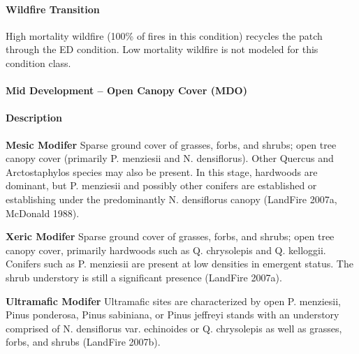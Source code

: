 \paragraph{Wildfire Transition} High mortality wildfire (100\% of fires in this condition) recycles the patch through the ED condition. Low mortality wildfire is not modeled for this condition class.

\noindent\hrulefill


\paragraph{Mid Development – Open Canopy Cover (MDO)}

\paragraph{Description}
\begin{adjustwidth}{2cm}{}
\textbf{Mesic Modifer } Sparse ground cover of grasses, forbs, and shrubs; open tree canopy cover (primarily P. menziesii and N. densiflorus). Other Quercus and Arctostaphylos species may also be present. In this stage, hardwoods are dominant, but P. menziesii and possibly other conifers are established or establishing under the predominantly N. densiflorus canopy (LandFire 2007a, McDonald 1988). 


\medskip
\noindent \textbf{Xeric Modifer}  Sparse ground cover of grasses, forbs, and shrubs; open tree canopy cover, primarily hardwoods such as Q. chrysolepis and Q. kelloggii. Conifers such as P. menziesii are present at low densities in emergent status. The shrub understory is still a significant presence (LandFire 2007a). 


\medskip
\noindent \textbf{Ultramafic Modifer}  Ultramafic sites are characterized by open P. menziesii, Pinus ponderosa, Pinus sabiniana, or Pinus jeffreyi stands with an understory comprised of N. densiflorus var. echinoides or Q. chrysolepis as well as grasses, forbs, and shrubs (LandFire 2007b).

\end{adjustwidth}
